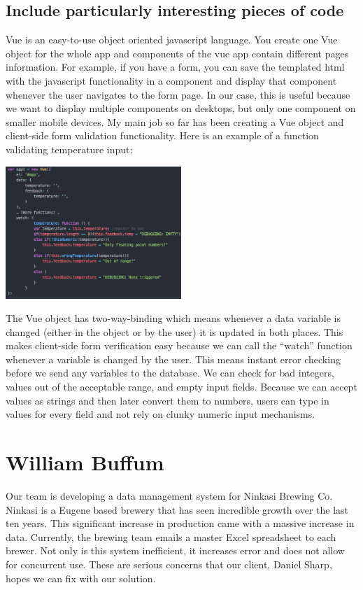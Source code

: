 \documentclass[draftclsnofoot,onecolumn,letterpaper,10pt,compsoc]{IEEEtran}
\begin{document}
\subsection{Include particularly interesting pieces of code}
Vue is an easy-to-use object oriented javascript language. You create one Vue object for the whole app and components of the vue app contain different pages information. For example, if you have a form, you can save the templated html with the javascript functionality in a component and display that component whenever the user navigates to the form page. In our case, this is useful because we want to display multiple components on desktops, but only one component on smaller mobile devices.
My main job so far has been creating a Vue object and client-side form validation functionality. Here is an example of a function validating temperature input:


\centerline{\includegraphics[height=5cm]{screenshots/vuecode.png}}

The Vue object has two-way-binding which means whenever a data variable is changed (either in the object or by the user) it is updated in both places. This makes client-side form verification easy because we can call the “watch” function whenever a variable is changed by the user. This means instant error checking before we send any variables to the database. We can check for bad integers, values out of the acceptable range, and empty input fields. Because we can accept values as strings and then later convert them to numbers, users can type in values for every field and not rely on clunky numeric input mechanisms.

\section{William Buffum}

Our team is developing a data management system for Ninkasi Brewing Co.
Ninkasi is a Eugene based brewery that has seen incredible growth over the last ten years.
This significant increase in production came with a massive increase in data.
Currently, the brewing team emails a master Excel spreadsheet to each brewer.
Not only is this system inefficient, it increases error and does not allow for concurrent use.
These are serious concerns that our client, Daniel Sharp, hopes we can fix with our solution.
\end{document}
